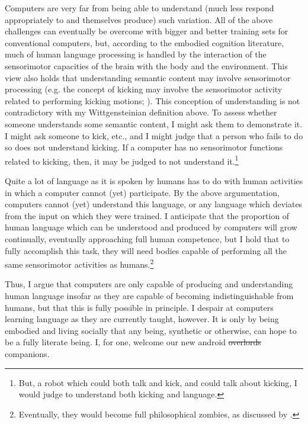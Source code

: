 \documentclass[man,12pt,natbib]{apa6}
\begin{document}
Computers are very far from being able to understand (much less respond
appropriately to and themselves produce) such variation.
All of the above challenges can eventually be overcome with bigger and better
training sets for conventional computers, but, according to the embodied
cognition literature, much of human language processing is handled by the
interaction of the sensorimotor capacities of the brain with the body and the
environment. This view also holds that understanding semantic content may
involve sensorimotor processing (e.g.  the concept of kicking may involve the
sensorimotor activity related to performing kicking motions;
\citealp{Rueschemeyer10}).  This conception of understanding is not
contradictory with my Wittgensteinian definition above. To assess whether
someone understands some semantic content, I might ask them to demonstrate it.
I might ask someone to kick, etc., and I might judge that a person who fails to
do so does not understand kicking. If a computer has no sensorimotor functions
related to kicking, then, it may be judged to not understand it.\footnote{But,
a robot which could both talk and kick, and could talk about kicking, I would
judge to understand both kicking and language.}

Quite a lot of language as it is spoken by humans has to do with human
activities in which a computer cannot (yet) participate. By the above
argumentation, computers cannot (yet) understand this language, or any language
which deviates from the input on which they were trained. I anticipate that the
proportion of human language which can be understood and produced by computers
will grow continually, eventually approaching full human competence, but I hold
that to fully accomplish this task, they will need bodies capable of performing
all the same sensorimotor activities as humans.\footnote{Eventually, they would
become full philosophical zombies, as discussed by \citet{Chalmers96}.}

Thus, I argue that computers are only capable of producing and understanding
human language insofar as they are capable of becoming indistinguishable from
humans, but that this is fully possible in principle. I despair at computers
learning language as they are currently taught, however. It is only by being
embodied and living socially that any being, synthetic or otherwise, can hope
to be a fully literate being. I, for one, welcome our new android
\st{overlords} companions.

\clearpage

\end{document}
